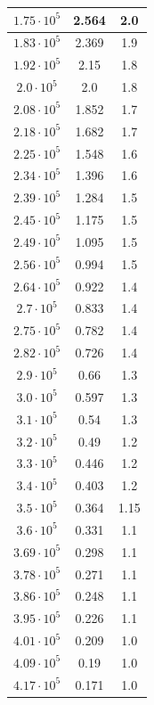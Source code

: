 \documentclass[a4paper,14pt]{article}
\begin{document}
\begin{longtable}{|c|c|c|}
$1.75 \cdot 10^5 $ & 2.564 & 2.0   \\ \hline
$1.83 \cdot 10^5 $ & 2.369 & 1.9   \\ \hline
$1.92 \cdot 10^5 $ & 2.15 & 1.8   \\ \hline
$2.0 \cdot 10^5 $ & 2.0 & 1.8   \\ \hline
$2.08 \cdot 10^5 $ & 1.852 & 1.7   \\ \hline
$2.18 \cdot 10^5 $ & 1.682 & 1.7   \\ \hline
$2.25 \cdot 10^5 $ & 1.548 & 1.6   \\ \hline
$2.34 \cdot 10^5 $ & 1.396 & 1.6   \\ \hline
$2.39 \cdot 10^5 $ & 1.284 & 1.5   \\ \hline
$2.45 \cdot 10^5 $ & 1.175 & 1.5   \\ \hline
$2.49 \cdot 10^5 $ & 1.095 & 1.5   \\ \hline
$2.56 \cdot 10^5 $ & 0.994 & 1.5   \\ \hline
$2.64 \cdot 10^5 $ & 0.922 & 1.4   \\ \hline
$2.7 \cdot 10^5 $ & 0.833 & 1.4   \\ \hline
$2.75 \cdot 10^5 $ & 0.782 & 1.4   \\ \hline
$2.82 \cdot 10^5 $ & 0.726 & 1.4   \\ \hline
$2.9 \cdot 10^5 $ & 0.66 & 1.3   \\ \hline
$3.0 \cdot 10^5 $ & 0.597 & 1.3   \\ \hline
$3.1 \cdot 10^5 $ & 0.54 & 1.3   \\ \hline
$3.2 \cdot 10^5 $ & 0.49 & 1.2   \\ \hline
$3.3 \cdot 10^5 $ & 0.446 & 1.2   \\ \hline
$3.4 \cdot 10^5 $ & 0.403 & 1.2   \\ \hline
$3.5 \cdot 10^5 $ & 0.364 & 1.15   \\ \hline
$3.6 \cdot 10^5 $ & 0.331 & 1.1   \\ \hline
$3.69 \cdot 10^5 $ & 0.298 & 1.1   \\ \hline
$3.78 \cdot 10^5 $ & 0.271 & 1.1   \\ \hline
$3.86 \cdot 10^5 $ & 0.248 & 1.1   \\ \hline
$3.95 \cdot 10^5 $ & 0.226 & 1.1   \\ \hline
$4.01 \cdot 10^5 $ & 0.209 & 1.0   \\ \hline
$4.09 \cdot 10^5 $ & 0.19 & 1.0   \\ \hline
$4.17 \cdot 10^5 $ & 0.171 & 1.0   \\ \hline

\end{longtable}
\end{document}
